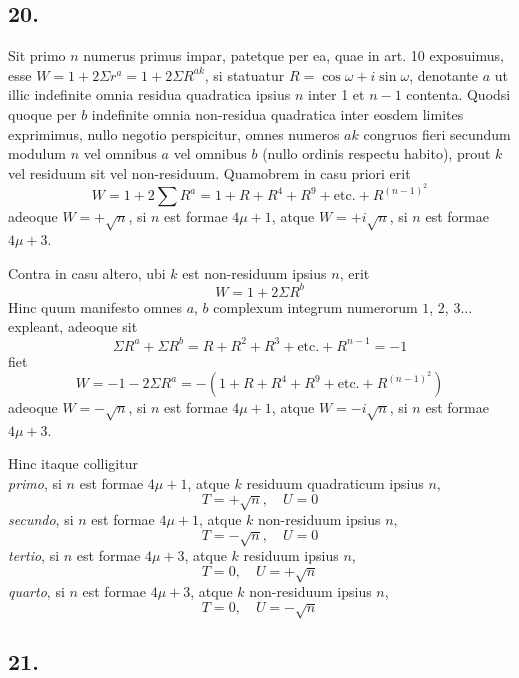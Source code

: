 \documentclass[twoside,12pt, showframe]{memoir}
\begin{document}
\subsection*{20.}
 
Sit primo \(n\) numerus primus impar, patetque per ea, quae in art. 10 exposuimus, esse \(W=1+2 \Sigma r^{a}=1+2 \Sigma R^{a k}\), si statuatur \(R=\cos \omega+i \sin \omega\), denotante \(a\) ut illic indefinite omnia residua quadratica ipsius \(n\) inter 1 et \(n-1\) contenta. Quodsi quoque per \(b\) indefinite omnia non-residua quadratica inter eosdem limites exprimimus, nullo negotio perspicitur, omnes numeros \(a k\) congruos fieri secundum modulum \(n\) vel omnibus \(a\) vel omnibus \(b\) (nullo ordinis respectu habito), prout \(k\) vel residuum sit vel non-residuum. Quamobrem in casu priori erit\clearpage\noindent%
\[W=1+2 \sum R^{a}=1+R+R^{4}+R^{9}+\text{etc.}+R^{(n-1)^{2}}\]
adeoque \(W=+\surd n\), si \(n\) est formae \(4 \mu+1\), atque \(W=+i \surd n\), si \(n\) est formae \(4 \mu+3\).

Contra in casu altero, ubi \(k\) est non-residuum ipsius \(n\), erit
\[W=1+2 \Sigma R^{b}\]
Hinc quum manifesto omnes \(a\), \(b\) complexum integrum numerorum \(1\), \(2\), \(3 \ldots\) expleant, adeoque sit
\[\Sigma R^{a}+\Sigma R^{b}=R+R^{2}+R^{3}+\text{etc.}+R^{n-1}=-1\]
fiet
\[W=-1-2 \Sigma R^{a}=-(1+R+R^{4}+R^{9}+\text{etc.}+R^{(n-1)^{2}})\]
adeoque \(W=-\surd n\), si \(n\) est formae \(4 \mu+1\), atque \(W=-i \surd n\), si \(n\) est formae \(4 \mu+3\).

Hinc itaque colligitur\\
\textit{primo}, si \(n\) est formae \(4 \mu+1\), atque \(k\) residuum quadraticum ipsius \(n\),
\[T=+\surd n, \quad U=0\]
\textit{secundo}, si \(n\) est formae \(4 \mu+1\), atque \(k\) non-residuum ipsius \(n\),
\[T=-\surd n, \quad U=0\]
\textit{tertio}, si \(n\) est formae \(4 \mu+3\), atque \(k\) residuum ipsius \(n\),
\[T=0, \quad U=+\surd n\]
\textit{quarto}, si \(n\) est formae \(4 \mu+3\), atque \(k\) non-residuum ipsius \(n\),
\[T=0, \quad U=-\surd n\]

\subsection*{21.}
 
\end{document}
